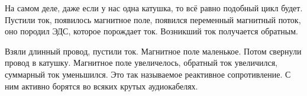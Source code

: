 	На самом деле, даже если у нас одна катушка, то всё равно подобный цикл будет.
	Пустили ток, появилось магнитное поле, появился переменный магнитный поток, оно породил ЭДС, которое порождает ток.
	Возникший ток получается обратным.
	\begin{exmp}
		Взяли длинный провод, пустили ток.
		Магнитное поле маленькое.
		Потом свернули провод в катушку.
		Магнитное поле увеличелось, обратный ток увеличился, суммарный ток уменьшился.
		Это так называемое реактивное сопротивление.
		С ним активно борятся во всяких крутых аудиокабелях.
	\end{exmp}
